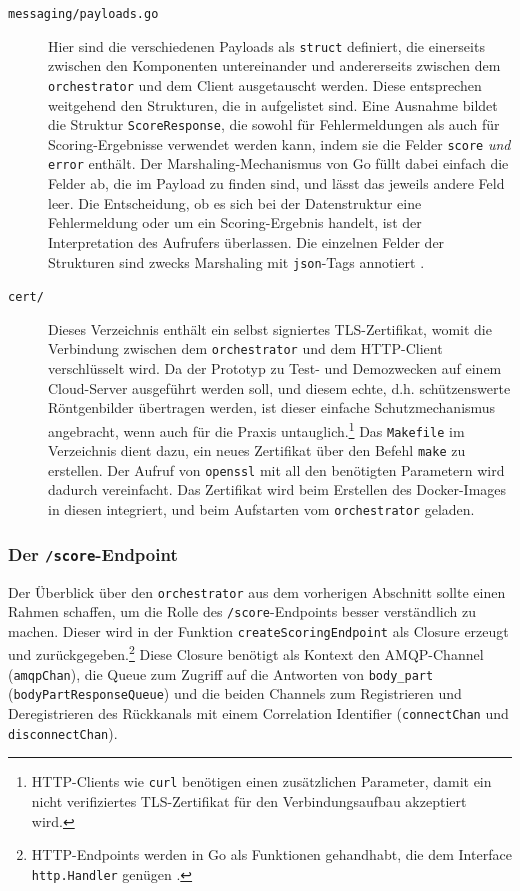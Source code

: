 \begin{description}
    \item[\texttt{messaging/payloads.go}] Hier sind die verschiedenen Payloads als \texttt{struct} definiert, die einerseits zwischen den Komponenten untereinander und andererseits zwischen dem \texttt{orchestrator} und dem Client ausgetauscht werden. Diese entsprechen weitgehend den Strukturen, die in  aufgelistet sind. Eine Ausnahme bildet die Struktur \texttt{ScoreResponse}, die sowohl für Fehlermeldungen als auch für Scoring-Ergebnisse verwendet werden kann, indem sie die Felder \texttt{score} \textit{und} \texttt{error} enthält. Der Marshaling-Mechanismus von Go füllt dabei einfach die Felder ab, die im Payload zu finden sind, und lässt das jeweils andere Feld leer. Die Entscheidung, ob es sich bei der Datenstruktur eine Fehlermeldung oder um ein Scoring-Ergebnis handelt, ist der Interpretation des Aufrufers überlassen. Die einzelnen Felder der Strukturen sind zwecks Marshaling mit \texttt{json}-Tags annotiert \cite[Kapitel 4.5]{gopl}.
    \item[\texttt{cert/}] Dieses Verzeichnis enthält ein selbst signiertes TLS-Zertifikat, womit die Verbindung zwischen dem \texttt{orchestrator} und dem HTTP-Client verschlüsselt wird. Da der Prototyp zu Test- und Demozwecken auf einem Cloud-Server ausgeführt werden soll, und diesem echte, d.h. schützenswerte Röntgenbilder übertragen werden, ist dieser einfache Schutzmechanismus angebracht, wenn auch für die Praxis untauglich.\footnote{HTTP-Clients wie \texttt{curl} benötigen einen zusätzlichen Parameter, damit ein nicht verifiziertes TLS-Zertifikat für den Verbindungsaufbau akzeptiert wird.} Das \texttt{Makefile} im Verzeichnis dient dazu, ein neues Zertifikat über den Befehl \texttt{make} zu erstellen. Der Aufruf von \texttt{openssl} mit all den benötigten Parametern wird dadurch vereinfacht. Das Zertifikat wird beim Erstellen des Docker-Images in diesen integriert, und beim Aufstarten vom \texttt{orchestrator} geladen.
\end{description}

\subsubsection{Der \texttt{/score}-Endpoint}
\label{sec:der-score-endpoint}

Der Überblick über den \texttt{orchestrator} aus dem vorherigen Abschnitt sollte einen Rahmen schaffen, um die Rolle des \texttt{/score}-Endpoints besser verständlich zu machen. Dieser wird in der Funktion \texttt{createScoringEndpoint} als Closure \cite[S. 136]{gopl} erzeugt und zurückgegeben.\footnote{HTTP-Endpoints werden in Go als Funktionen gehandhabt, die dem Interface \texttt{http.Handler} genügen \cite[Kapitel 7.7]{gopl}.} Diese Closure benötigt als Kontext den AMQP-Channel (\texttt{amqpChan}), die Queue zum Zugriff auf die Antworten von \texttt{body\_part} (\texttt{bodyPartResponse\-Queue}) und die beiden Channels zum Registrieren und Deregistrieren des Rückkanals mit einem Correlation Identifier (\texttt{connectChan} und \texttt{disconnectChan}).

